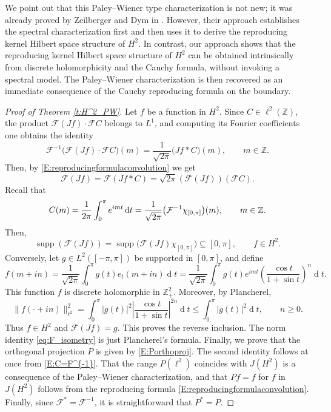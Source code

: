\documentclass[12pt,a4paper,reqno]{amsart}
\theoremstyle{definition}
\theoremstyle{definition}\newtheorem{defn}[thm]{Definition}
\begin{document}
    We point out that this Paley--Wiener type characterization is not new; it was
    already proved by Zeilberger and Dym in \cite[Theorem W3]{ZD}. However, their approach
    establishes the spectral characterization first and then uses it to derive the
    reproducing kernel Hilbert space structure of $H^2$. In contrast, our approach
    shows that the reproducing kernel Hilbert space structure of \(H^2\) can be
    obtained intrinsically from discrete holomorphicity and the Cauchy formula,
    without invoking a spectral model. The Paley--Wiener characterization is then
    recovered as an immediate consequence of the Cauchy reproducing formula on the
    boundary.
    
    \begin{proof}[Proof of Theorem \ref{t:H^2_PW}]
    Let $f$ be a function in $H^2$. Since $C\in\ell^2(\mathbb{Z})$, the product $\mathcal{F}(Jf)\cdot \mathcal{F}C$ belongs to $L^1$, and computing its Fourier coefficients one obtains the identity
    \[
    \mathcal{F}^{-1}\big(\mathcal{F}(Jf)\cdot \mathcal{F}C\big)(m)=\frac{1}{\sqrt{2\pi}}\big(Jf\ast C\big)(m), \qquad m\in\mathbb{Z}.
    \]
    Then, by \eqref{E:reproducingformulaconvolution} we get
    \[
    \mathcal F(Jf)= \mathcal F(Jf\ast C)=\sqrt{2\pi}(\mathcal F (Jf))(\mathcal FC).
    \]
    Recall that
    \begin{equation}\label{E:C=F^{-1}}
    C(m)=\frac{1}{2\pi}\int_0^{\pi}e^{imt}\operatorname{d}\!t=\frac{1}{\sqrt{2\pi}}\big(\mathcal{F}^{-1}\chi_{[0,\pi]}\big)(m), \qquad m\in\mathbb{Z}.
    \end{equation}
    Then, 
    \[
    \operatorname{supp}(\mathcal F(Jf)) = \operatorname{supp}\!\big(\mathcal F (Jf)\chi_{[0,\pi]}\big)\subseteq [0,\pi],\qquad f\in H^2.
    \]
    Conversely, let \(g\in L^2([-\pi,\pi])\) be supported in \([0,\pi]\), and define
    \begin{equation}\label{eq:f_representation_spectral}
    f(m+in)
    =\frac{1}{\sqrt{2\pi}}\int_0^\pi
    g(t)e_t(m+in)
    \operatorname{d}\!t=
    \frac{1}{\sqrt{2\pi}}\int_0^\pi
    g(t)e^{imt}
    \left(\frac{\cos t}{1+\sin t}\right)^n
    \operatorname{d}\!t.
    \end{equation}
    This function $f$ is discrete holomorphic in $\mathbb Z^2_+$.  
    Moreover, by Plancherel,
    \[
    \|f(\cdot+in)\|_{\ell^2}^2
    =
    \int_0^\pi
    |g(t)|^2
    \left|
    \frac{\cos t}{1+\sin t}
    \right|^{2n}
    \operatorname{d}\!t
    \leqslant
    \int_0^\pi |g(t)|^2\operatorname{d}\!t ,\qquad n\geqslant 0.
    \]
    Thus $f\in H^2$ and $\mathcal F(Jf)=g$.
    This proves the reverse inclusion. The norm identity \eqref{eq:F_isometry} is just Plancherel's formula. Finally, we prove that the orthogonal projection $P$ is given by \eqref{E:Porthoproj}. The second identity follows at once from \eqref{E:C=F^{-1}}. That the range $P(\ell^2)$ coincides with $J(H^2)$ is a consequence of the Paley--Wiener characterization, and that $Pf=f$ for $f$ in $J(H^2)$ follows from the reproducing formula \eqref{E:reproducingformulaconvolution}. Finally, since $\mathcal{F}^*=\mathcal{F}^{-1}$, it is straightforward that $P^*=P$.
    \end{proof}
    
\end{document}

